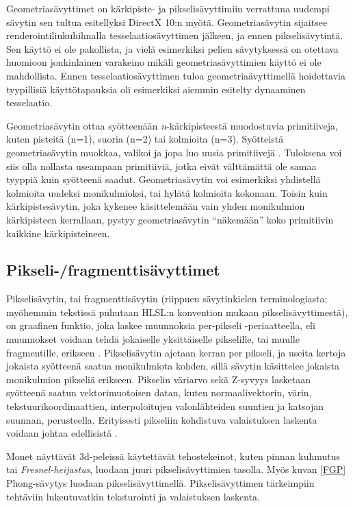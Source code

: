 \documentclass[finnish]{tktltiki2}
\theoremstyle{definition}
\theoremstyle{remark}
\begin{document}
Geometriasävyttimet on kärkipiste- ja pikselisävyttimiin verrattuna uudempi sävytin sen tultua esitellyksi DirectX 10:n myötä. Geometriasävytin sijaitsee renderointiliukuhihnalla tesselaatiosävyttimen jälkeen, ja ennen pikselisävytintä. Sen käyttö ei ole pakollista, ja vielä esimerkiksi pelien sävytyksessä on otettava huomioon jonkinlainen varakeino mikäli geometriasävyttimien käyttö ei ole mahdollista. Ennen tesselaatiosävyttimen tuloa geometriaävyttimellä hoidettavia tyypillisiä käyttötapauksia oli esimerkiksi aiemmin esitelty dynaaminen tesselaatio.

Geometriasävytin ottaa syötteenään \emph{n}-kärkipisteestä muodostuvia primitiiveja, kuten pisteitä (n=1), suoria (n=2) tai kolmioita (n=3). Syötteistä geometriasävytin muokkaa, valikoi ja jopa luo uusia primitiivejä \cite{Gre14}. Tuloksena voi siis olla nollasta useampaan primitiiviä, jotka eivät välttämättä ole samaa tyyppiä kuin syötteenä saadut. Geometriasävytin voi esimerkiksi yhdistellä kolmioita uudeksi monikulmioksi, tai hylätä kolmioita kokonaan. Toisin kuin kärkipistesävytin, joka kykenee käsittelemään vain yhden monikulmion kärkipisteen kerrallaan, pystyy geometriasävytin ``näkemään'' koko primitiivin kaikkine kärkipisteineen.

\subsection{Pikseli-/fragmenttisävyttimet}

Pikselisävytin, tai fragmenttisävytin (riippuen sävytinkielen terminologiasta; myöhemmin tekstissä puhutaan HLSL:n konvention mukaan pikselisävyttimestä), on graafinen funktio, joka laskee muunnoksia per-pikseli -periaatteella, eli muunnokset voidaan tehdä jokaiselle yksittäiselle pikselille, tai muulle fragmentille, erikseen \cite{}. Pikselisävytin ajetaan kerran per pikseli, ja useita kertoja jokaista syötteenä saatua monikulmiota kohden, sillä sävytin käsittelee jokaista monikulmion pikseliä erikseen. Pikselin väriarvo sekä Z-syvyys lasketaan syötteenä saatun vektorimuotoisen datan, kuten normaalivektorin, värin, tekstuurikoordinaattien, interpoloitujen valonlähteiden suuntien ja katsojan suunnan, perusteella. Erityisesti pikseliin kohdistuva valaistuksen laskenta voidaan johtaa edellisistä \cite{Puh08}.

Monet näyttävät 3d-peleissä käytettävät tehostekeinot, kuten pinnan kuhmutus tai \emph{Fresnel-heijastus}, luodaan juuri pikselisävyttimien tasolla. Myös kuvan \ref{FGP} Phong-sävytys luodaan pikselisävyttimellä. Pikselisävyttimen tärkeimpiin tehtäviin lukeutuvatkin teksturointi ja valaistuksen laskenta.
\end{document}
